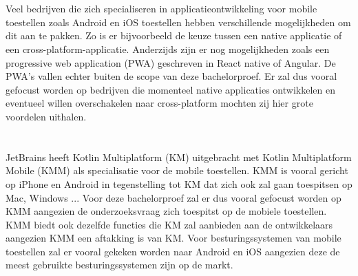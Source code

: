 \section{}
\label{sec:probleemstelling}

Veel bedrijven die zich specialiseren in applicatieontwikkeling voor mobile toestellen zoals Android en iOS toestellen hebben verschillende mogelijkheden om dit aan te pakken. Zo is er bijvoorbeeld de keuze tussen een native applicatie of een cross-platform-applicatie. Anderzijds zijn er nog mogelijkheden zoals een progressive web application (PWA) geschreven in React native of Angular. De PWA's vallen echter buiten de scope van deze bachelorproef. Er zal dus vooral gefocust worden op bedrijven die momenteel native applicaties ontwikkelen en eventueel willen overschakelen naar cross-platform mochten zij hier grote voordelen uithalen.



\section{}
\label{sec:afbakening}

JetBrains heeft Kotlin Multiplatform (KM) uitgebracht met Kotlin Multiplatform Mobile (KMM) als specialisatie voor de mobile toestellen. KMM is vooral gericht op iPhone en Android in tegenstelling tot KM dat zich ook zal gaan toespitsen op Mac, Windows ... Voor deze bachelorproef zal er dus vooral gefocust worden op KMM aangezien de onderzoeksvraag zich toespitst op de mobiele toestellen. KMM biedt ook dezelfde functies die KM zal aanbieden aan de ontwikkelaars aangezien KMM een aftakking is van KM. Voor besturingssystemen van mobile toestellen zal er vooral gekeken worden naar Android en iOS aangezien deze de meest gebruikte besturingssystemen zijn op de markt.


